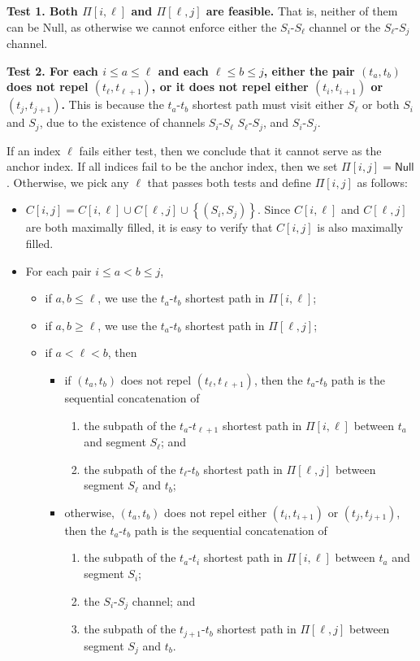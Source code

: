 \documentclass[11pt]{article}
\newcommand{\set}[1]{\left\{ #1 \right\}}
\begin{document}
\textbf{Test 1. Both $\Pi[i,\ell]$ and $\Pi[\ell,j]$ are feasible.} That is, neither of them can be \textsf{Null}, as otherwise we cannot enforce either the $S_i$-$S_{\ell}$ channel or the $S_{\ell}$-$S_{j}$ channel.

\textbf{Test 2. For each $i\le a\le \ell$ and each $\ell\le b\le j$, either the pair $(t_a,t_b)$ does not repel $(t_\ell,t_{\ell+1})$, or it does not repel either $(t_i,t_{i+1})$ or $(t_j,t_{j+1})$.}
This is because the $t_a$-$t_b$ shortest path must visit either $S_{\ell}$ or both $S_i$ and $S_j$, due to the existence of channels $S_i$-$S_{\ell}$ $S_{\ell}$-$S_{j}$, and $S_i$-$S_{j}$.

If an index $\ell$ fails either test, then we conclude that it cannot serve as the anchor index.
If all indices fail to be the anchor index, then we set $\Pi[i,j] = \textsf{Null}$.
Otherwise, we pick any $\ell$ that passes both tests and define $\Pi[i,j]$ as follows:
\begin{itemize}
\item $C[i,j]=C[i,\ell] \cup C[\ell,j] \cup \set{(S_i,S_j)}$. Since $C[i,\ell]$ and $C[\ell,j]$ are both maximally filled, it is easy to verify that $C[i,j]$ is also maximally filled.
\item For each pair $i\le a<b\le j$,
\begin{itemize}
    \item if $a,b\le \ell$, we use the $t_a$-$t_b$ shortest path in $\Pi[i,\ell]$;
    \item if $a,b\ge \ell$, we use the $t_a$-$t_b$ shortest path in $\Pi[\ell,j]$;
    \item if $a< \ell <b$, then
\begin{itemize}
    \item if $(t_a,t_b)$ does not repel $(t_\ell,t_{\ell+1})$, then the $t_a$-$t_b$ path is the sequential concatenation of 
    \begin{enumerate}
        \item the subpath of the $t_a$-$t_{\ell+1}$ shortest path in $\Pi[i,\ell]$ between $t_a$ and segment $S_\ell$; and
        \item the subpath of the $t_\ell$-$t_b$ shortest path in $\Pi[\ell,j]$ between segment $S_\ell$ and $t_b$;
    \end{enumerate}
    \item otherwise, $(t_a,t_b)$ does not repel either $(t_i,t_{i+1})$ or $(t_j,t_{j+1})$, then the $t_a$-$t_b$ path is the sequential concatenation of \begin{enumerate}
        \item the subpath of the $t_a$-$t_i$ shortest path in $\Pi[i,\ell]$ between $t_a$ and segment $S_i$;
        \item the $S_i$-$S_{j}$ channel; and
        \item the subpath of the $t_{j+1}$-$t_b$ shortest path in $\Pi[\ell,j]$ between segment $S_j$ and $t_b$.
    \end{enumerate} 
\end{itemize}
\end{itemize}
\end{itemize}
\end{document}
